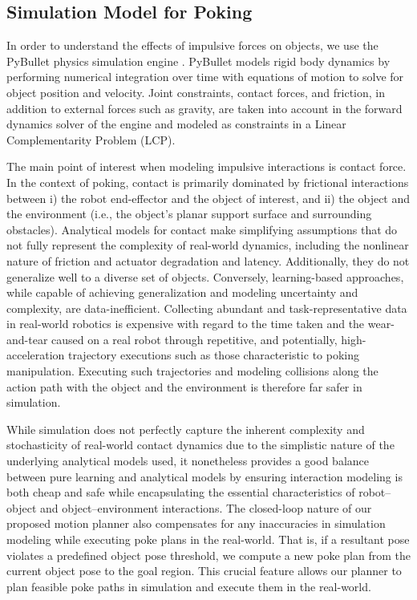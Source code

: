 \subsection{Simulation Model for Poking}\label{sec:sim-model}

In order to understand the effects of impulsive forces on objects, we use the PyBullet physics simulation engine \cite{coumans2019}. PyBullet models rigid body dynamics by performing numerical integration over time with equations of motion to solve for object position and velocity. Joint constraints, contact forces, and friction, in addition to external forces such as gravity, are taken into account in the forward dynamics solver of the engine and modeled as constraints in a Linear Complementarity Problem (LCP).

The main point of interest when modeling impulsive interactions is contact force. In the context of poking,  contact is primarily dominated by frictional interactions between i) the robot end-effector and the object of interest, and ii) the object and the environment (i.e., the object's planar support surface and surrounding obstacles). Analytical models for contact make simplifying assumptions that do not fully represent the complexity of real-world dynamics, including the nonlinear nature of friction and actuator degradation and latency. Additionally, they do not generalize well to a diverse set of objects.
Conversely, learning-based approaches, while capable of achieving generalization and modeling uncertainty and complexity, are data-inefficient. Collecting abundant and task-representative data in real-world robotics is expensive with regard to the time taken and the wear-and-tear caused on a real robot through repetitive, and potentially, high-acceleration trajectory executions such as those characteristic to poking manipulation. Executing such trajectories and modeling collisions along the action path with the object and the environment is therefore far safer in simulation.

While simulation does not perfectly capture the inherent complexity and stochasticity of real-world contact dynamics due to the simplistic nature of the underlying analytical models used, it nonetheless provides a good balance between pure learning and analytical models by ensuring interaction modeling is both cheap and safe while encapsulating the essential characteristics of robot--object and object--environment interactions. The closed-loop nature of our proposed motion planner also compensates for any inaccuracies in simulation modeling while executing poke plans in the real-world. That is, if a resultant pose violates a predefined object pose threshold, we compute a new poke plan from the current object pose to the goal region. This crucial feature allows our planner to plan feasible poke paths in simulation and execute them in the real-world.\vspace{-4pt}
